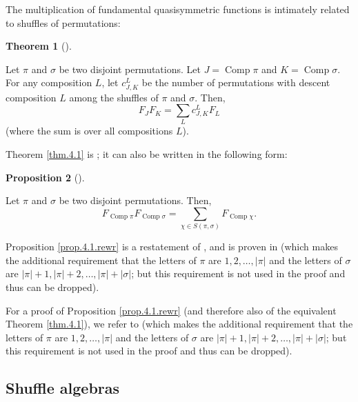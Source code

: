 \documentclass[numbers=enddot,12pt,final,onecolumn,notitlepage]{scrartcl}%
\theoremstyle{definition}
\newtheorem{theo}{Theorem}[section]
\newenvironment{theorem}[1][]
{\begin{theo}[#1]\begin{leftbar}}
{\end{leftbar}\end{theo}}
\newtheorem{prop}[theo]{Proposition}
\newenvironment{proposition}[1][]
{\begin{prop}[#1]\begin{leftbar}}
{\end{leftbar}\end{prop}}
\newenvironment{verlong}{}{}
\newenvironment{vershort}{}{}
\let\sumnonlimits\sum
\renewcommand{\sum}{\sumnonlimits\limits}
\begin{document}
The multiplication of fundamental quasisymmetric functions is intimately
related to shuffles of permutations:

\begin{verlong}
\begin{theorem}
\label{thm.4.1}Let $\pi$ and $\sigma$ be two disjoint permutations. Let
$J=\operatorname*{Comp}\pi$ and $K=\operatorname*{Comp}\sigma$. For any
composition $L$, let $c_{J,K}^{L}$ be the number of permutations with descent
composition $L$ among the shuffles of $\pi$ and $\sigma$. Then,%
\[
F_{J}F_{K}=\sum_{L}c_{J,K}^{L}F_{L}%
\]
(where the sum is over all compositions $L$).
\end{theorem}

Theorem \ref{thm.4.1} is \cite[Theorem 4.1]{part1}; it can also be written in
the following form:
\end{verlong}

\begin{proposition}
\label{prop.4.1.rewr}Let $\pi$ and $\sigma$ be two disjoint permutations.
Then,%
\[
F_{\operatorname*{Comp}\pi}F_{\operatorname*{Comp}\sigma}=\sum_{\chi\in
S\left(  \pi,\sigma\right)  }F_{\operatorname*{Comp}\chi}.
\]

\end{proposition}

\begin{vershort}
Proposition \ref{prop.4.1.rewr} is a restatement of \cite[Theorem 4.1]{part1},
and is proven in \cite[(5.2.6)]{HopfComb} (which makes the additional
requirement that the letters of $\pi$ are $1,2,\ldots,\left\vert
\pi\right\vert $ and the letters of $\sigma$ are $\left\vert \pi\right\vert
+1,\left\vert \pi\right\vert +2,\ldots,\left\vert \pi\right\vert +\left\vert
\sigma\right\vert $; but this requirement is not used in the proof and thus
can be dropped).
\end{vershort}

\begin{verlong}
For a proof of Proposition \ref{prop.4.1.rewr} (and therefore also of the
equivalent Theorem \ref{thm.4.1}), we refer to \cite[(5.2.6)]{HopfComb} (which
makes the additional requirement that the letters of $\pi$ are $1,2,\ldots
,\left\vert \pi\right\vert $ and the letters of $\sigma$ are $\left\vert
\pi\right\vert +1,\left\vert \pi\right\vert +2,\ldots,\left\vert
\pi\right\vert +\left\vert \sigma\right\vert $; but this requirement is not
used in the proof and thus can be dropped).
\end{verlong}

\subsection{Shuffle algebras}
\end{document}
